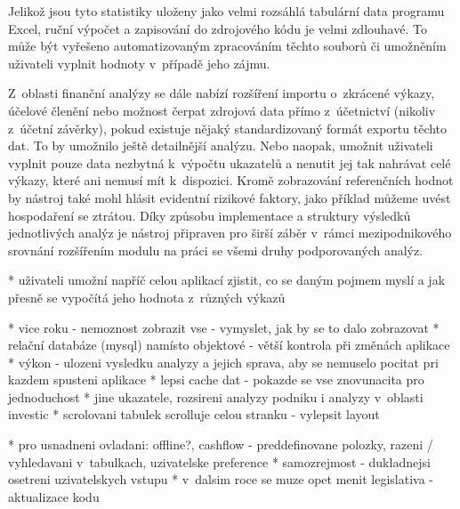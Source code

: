 Jelikož jsou tyto statistiky uloženy jako velmi rozsáhlá tabulární data programu Excel, ruční výpočet a zapisování do zdrojového kódu je velmi zdlouhavé. To může být vyřešeno automatizovaným zpracováním těchto souborů či umožněním uživateli vyplnit hodnoty v~případě jeho zájmu.

Z~oblasti finanční analýzy se dále nabízí rozšíření importu o~zkrácené výkazy, účelové členění nebo možnost čerpat zdrojová data přímo z~účetnictví (nikoliv z~účetní závěrky), pokud existuje nějaký standardizovaný formát exportu těchto dat. To by umožnilo ještě detailnější analýzu. Nebo naopak, umožnit uživateli vyplnit pouze data nezbytná k~výpočtu ukazatelů a nenutit jej tak nahrávat celé výkazy, které ani nemusí mít k~dispozici. Kromě zobrazování referenčních hodnot by nástroj také mohl hlásit evidentní rizikové faktory, jako příklad můžeme uvést hospodaření se ztrátou. Díky způsobu implementace a struktury výsledků jednotlivých analýz je nástroj připraven pro širší záběr v~rámci mezipodnikového srovnání rozšířením modulu na práci se všemi druhy podporovaných analýz.


* uživateli umožní napříč celou aplikací zjistit, co se daným pojmem myslí a jak přesně se vypočítá jeho hodnota z~různých výkazů

* vice roku - nemoznost zobrazit vse - vymyslet, jak by se to dalo zobrazovat
* relační databáze (mysql) namísto objektové - větší kontrola při změnách aplikace
* výkon - ulozeni vysledku analyzy a jejich sprava, aby se nemuselo pocitat pri kazdem spusteni aplikace
* lepsi cache dat - pokazde se vse znovunacita pro jednoduchost
* jine ukazatele, rozsireni analyzy podniku i analyzy v~oblasti investic
* scrolovani tabulek scrolluje celou stranku - vylepsit layout

* pro usnadneni ovladani: offline?, cashflow - preddefinovane polozky, razeni / vyhledavani v~tabulkach, uzivatelske preference
* samozrejmost - dukladnejsi osetreni uzivatelskych vstupu
* v~dalsim roce se muze opet menit legislativa - aktualizace kodu

